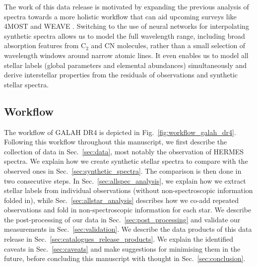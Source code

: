 \documentclass[
  journal=pasa,
  manuscript=research-paper, %
  year=2023,
  volume=37
]{cup-journal}
\begin{document}
The work of this data release is motivated by expanding the previous analysis of spectra towards a more holistic workflow that can aid upcoming surveys like 4MOST \citep{4MOST2019} and WEAVE \citep{Dalton2014}. Switching to the use of neural networks for interpolating synthetic spectra allows us to model the full wavelength range, including broad absorption features from $\mathrm{C_2}$ and CN molecules, rather than a small selection of wavelength windows around narrow atomic lines. It even enables us to model all stellar labels (global parameters and elemental abundances) simultaneously and derive interstellar properties from the residuals of observations and synthetic stellar spectra.

\subsection{Workflow} \label{sec:workflow}

The workflow of GALAH DR4 is depicted in Fig.~\ref{fig:workflow_galah_dr4}. Following this workflow throughout this manuscript, we first describe the collection of data in Sec.~\ref{sec:data}, most notably the observation of HERMES spectra. We explain how we create synthetic stellar spectra to compare with the observed ones in Sec.~\ref{sec:synthetic_spectra}. The comparison is then done in two consecutive steps. In Sec.~\ref{sec:allspec_analysis}, we explain how we extract stellar labels from individual observations (without non-spectroscopic information folded in), while Sec.~\ref{sec:allstar_analysis} describes how we co-add repeated observations and fold in non-spectroscopic information for each star. We describe the post-processing of our data in Sec.~\ref{sec:post_processing} and validate our measurements in Sec.~\ref{sec:validation}. We describe the data products of this data release in Sec.~\ref{sec:catalogues_release_products}. We explain the identified caveats in Sec.~\ref{sec:caveats} and make suggestions for minimising them in the future, before concluding this manuscript with thought in Sec.~\ref{sec:conclusion}.
\end{document}
